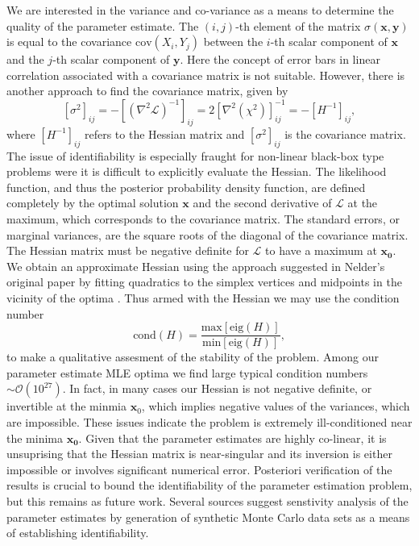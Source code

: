 \documentclass[12pt,a4paper,oneside]{book}
\begin{document}
We are interested in the variance and co-variance as a means to determine the quality of the parameter estimate. The $\left( i, j \right)$-th element of the matrix $\sigma (\mathbf{x}, \mathbf{y})$ is equal to the covariance $\mbox{cov}(X_i, Y_j)$ between the $i$-th scalar component of $\mathbf{x}$ and the $j$-th scalar component of $\mathbf{y}$. Here the concept of error bars in linear correlation associated with a covariance matrix is not suitable. However, there is another approach to find the covariance matrix, given by
\[ \left[\sigma^2 \right]_{ij} = -\left[ \left( \nabla^2 \mathcal{L}\right)^{-1}\right]_{ij} = 2 \left[ \nabla^2 \left( \chi^2\right)\right]_{ij}^{-1} = -\left[H^{-1} \right]_{ij},\]
where $\left[H^{-1} \right]_{ij}	$ refers to the Hessian matrix and $\left[\sigma^2 \right]_{ij}$ is the covariance matrix. The issue of identifiability is especially fraught for non-linear black-box type problems were it is difficult to explicitly evaluate the Hessian. 
The likelihood function, and thus the posterior probability density function, are defined completely by the optimal solution $\mathbf{x}$ and the second derivative of $\mathcal{L}$ at the maximum, which corresponds to the covariance matrix. The standard errors, or marginal variances, are the square roots of the diagonal of the covariance matrix. The Hessian matrix must be negative definite for $\mathcal{L}$ to have a maximum at $\mathbf{x_0}$. We obtain an approximate Hessian using the approach suggested in Nelder's original paper by fitting quadratics to the simplex vertices and midpoints in the vicinity of the optima \cite{nelder_simplex_1965, spendley_sequential_1962}. Thus armed with the Hessian we may use the condition number
\[ \mbox{cond} (H) = \frac{\mbox{max}[\mbox{eig}(H)]}{\mbox{min}[\mbox{eig}(H)]}, \]
to make a qualitative assesment of the stability of the problem. Among our parameter estimate MLE optima we find large typical condition numbers $\sim \mathcal{O}(10^{27})$. In fact, in many cases our Hessian is not negative definite, or invertible at the minmia $\mathbf{x}_0$, which implies negative values of the variances, which are impossible. These issues indicate the problem is extremely ill-conditioned near the minima $\mathbf{x_0}$. Given that the parameter estimates are highly co-linear, it is unsuprising that the Hessian matrix is near-singular and its inversion is either impossible or involves significant numerical error. Posteriori verification of the results is crucial to bound the identifiability of the parameter estimation problem, but this remains as future work. Several sources suggest senstivity analysis of the parameter estimates by generation of synthetic Monte Carlo data sets as a means of establishing identifiability\cite{bevington_data_1969, jaqaman_linking_2006}.
\end{document}
